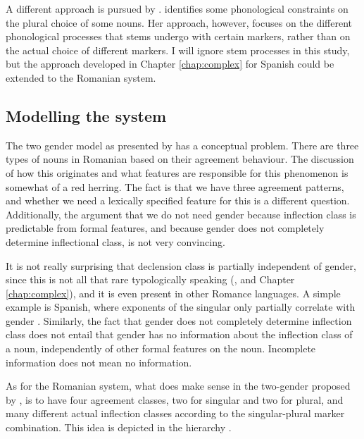 A different approach is pursued by \textcite{Steriade.2008}. \citeauthor{Steriade.2008} identifies some phonological constraints on the plural choice of some nouns. Her approach, however, focuses on the different phonological processes that stems undergo with certain markers, rather than on the actual choice of different markers. I will ignore stem processes in this study, but the approach developed in Chapter \ref{chap:complex} for Spanish could be extended to the Romanian system.

\subsection{Modelling the system}

The two gender model as presented by \textcite{Bateman.2010} has a conceptual problem. There are three types of nouns in Romanian based on their agreement behaviour. The discussion of how this originates and what features are responsible for this phenomenon is somewhat of a red herring. The fact is that we have three agreement patterns, and whether we need a lexically specified feature for this is a different question. Additionally, the argument that we do not need gender because inflection class is predictable from formal features, and because gender does not completely determine inflectional class, is not very convincing.

It is not really surprising that declension class is partially independent of gender, since this is not all that rare typologically speaking (\cite{Corbett.1991}, and Chapter \ref{chap:complex}), and it is even present in other Romance languages. A simple example is Spanish, where exponents of the singular only partially correlate with gender \autocite{Harris.1991}. Similarly, the fact that gender does not completely determine inflection class does not entail that gender has no information about the inflection class of a noun, independently of other formal features on the noun. Incomplete information does not mean no information.

As for the Romanian system, what does make sense in the two-gender proposed by \textcite{Bateman.2010}, is to have four agreement classes, two for singular and two for plural, and many different actual inflection classes according to the singular-plural marker combination. This idea is depicted in the hierarchy .

